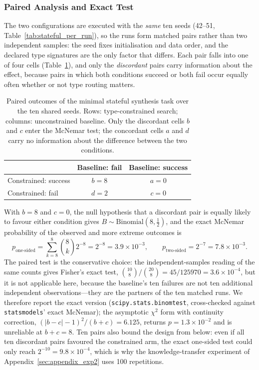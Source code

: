\subsubsection{Paired Analysis and Exact Test}
\label{sec:paired_test}

The two configurations are executed with the \emph{same} ten seeds (42--51, Table~\ref{tab:stateful_per_run}), so the runs form matched pairs rather than two independent samples: the seed fixes initialisation and data order, and the declared type signatures are the only factor that differs. Each pair falls into one of four cells (Table~\ref{tab:stateful_paired}), and only the \emph{discordant} pairs carry information about the effect, because pairs in which both conditions succeed or both fail occur equally often whether or not type routing matters.

\begin{table}[htbp]
    \centering
    \small
    \caption{Paired outcomes of the minimal stateful synthesis task over the ten shared seeds. Rows: type-constrained search; columns: unconstrained baseline. Only the discordant cells $b$ and $c$ enter the McNemar test; the concordant cells $a$ and $d$ carry no information about the difference between the two conditions.}
    \label{tab:stateful_paired}
    \begin{tabular}{lcc}
        \toprule
                             & Baseline: fail & Baseline: success \\
        \midrule
        Constrained: success & $b = 8$        & $a = 0$           \\
        Constrained: fail    & $d = 2$        & $c = 0$           \\
        \bottomrule
    \end{tabular}
\end{table}

With $b=8$ and $c=0$, the null hypothesis that a discordant pair is equally likely to favour either condition gives $B \sim \mathrm{Binomial}(8, \tfrac12)$, and the exact McNemar probability of the observed and more extreme outcomes is
\[
p_{\text{one-sided}} = \sum_{k=8}^{8}\binom{8}{k}2^{-8} = 2^{-8} = 3.9\times10^{-3},
\qquad
p_{\text{two-sided}} = 2^{-7} = 7.8\times10^{-3}.
\]
The paired test is the conservative choice: the independent-samples reading of the same counts gives Fisher's exact test, $\binom{10}{8}\big/\binom{20}{8} = 45/125970 = 3.6\times10^{-4}$, but it is not applicable here, because the baseline's ten failures are not ten additional independent observations---they are the partners of the ten matched runs. We therefore report the exact version (\texttt{scipy.stats.binomtest}, cross-checked against \texttt{statsmodels}' exact McNemar); the asymptotic $\chi^2$ form with continuity correction, $(|b-c|-1)^2/(b+c) = 6.125$, returns $p = 1.3\times10^{-2}$ and is unreliable at $b+c = 8$. Ten pairs also bound the design from below: even if all ten discordant pairs favoured the constrained arm, the exact one-sided test could only reach $2^{-10} = 9.8\times10^{-4}$, which is why the knowledge-transfer experiment of Appendix~\ref{sec:appendix_exp2} uses 100 repetitions.

